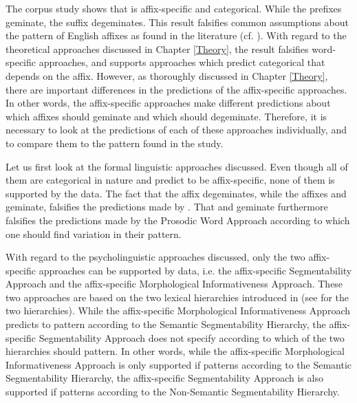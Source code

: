 The corpus study shows that  is affix-specific and categorical. While the prefixes geminate, the suffix  degeminates. 
This result falsifies common assumptions about the  pattern of English affixes as found in the literature (cf. ). 
With regard to the theoretical approaches discussed in Chapter \ref{Theory}, the result falsifies word-specific approaches, and supports approaches which predict categorical  that depends on the affix. However, as thoroughly discussed in Chapter \ref{Theory}, there are important differences in the predictions of the affix-specific approaches. In other words, the affix-specific approaches make different predictions about which affixes should geminate and which should degeminate. Therefore, it is necessary to look at the predictions of each of these approaches individually, and to compare them to the  pattern found in the study.

Let us first look at the formal linguistic approaches discussed. Even though all of them are categorical in nature and predict  to be affix-specific, none of them is supported by the data. The fact that the  affix  degeminates, while the  affixes  and  geminate, falsifies the predictions made by . That  and  geminate furthermore falsifies the predictions made by the Prosodic Word Approach according to which one should find variation in their  pattern. 

With regard to the psycholinguistic approaches discussed, only the two affix-specific approaches can be supported by data, i.e. the affix-specific Segmentability Approach and the affix-specific Morphological Informativeness Approach. 
These two approaches are based on the two lexical  hierarchies introduced in  (see  for the two hierarchies). While the affix-specific Morphological Informativeness Approach predicts  to pattern according to the Semantic Segmentability Hierarchy, the affix-specific Segmentability Approach does not specify according to which of the two  hierarchies  should pattern. In other words, while the affix-specific Morphological Informativeness Approach is only supported if  patterns according to the Semantic Segmentability Hierarchy, the affix-specific Segmentability Approach is also supported if  patterns according to the Non-Semantic Segmentability Hierarchy. 


